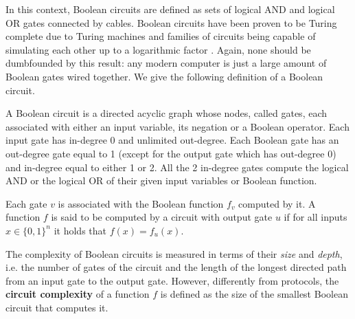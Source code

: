 In this context, Boolean circuits are defined as sets of logical AND and logical OR gates connected by cables. Boolean circuits have been proven to be Turing complete due to Turing machines and families of circuits being capable of simulating each other up to a logarithmic factor \cite{complexity_arora_barak}. Again, none should be dumbfounded by this result: any modern computer is just a large amount of Boolean gates wired together. We give the following definition of a Boolean circuit. \cite{comm_compl_appl}

\begin{definition}
    A Boolean circuit is a directed acyclic graph whose nodes, called gates, each associated with either an input variable, its negation or a Boolean operator. Each input gate has in-degree 0 and unlimited out-degree. Each Boolean gate has an out-degree gate equal to 1 (except for the output gate which has out-degree 0) and in-degree equal to either 1 or 2. All the 2 in-degree gates compute the logical AND or the logical OR of their given input variables or Boolean function. 
\end{definition}

Each gate $v$ is associated with the Boolean function $f_v$ computed by it. A function $f$ is said to be computed by a circuit with output gate $u$ if for all inputs $x \in \{0,1\}^n$ it holds that $f(x) =  f_u(x)$.

The complexity of Boolean circuits is measured in terms of their \textit{size} and \textit{depth}, i.e. the number of gates of the circuit and the length of the longest directed path from an input gate to the output gate. However, differently from protocols, the \textbf{circuit complexity} of a function $f$ is defined as the size of the smallest Boolean circuit that computes it.


